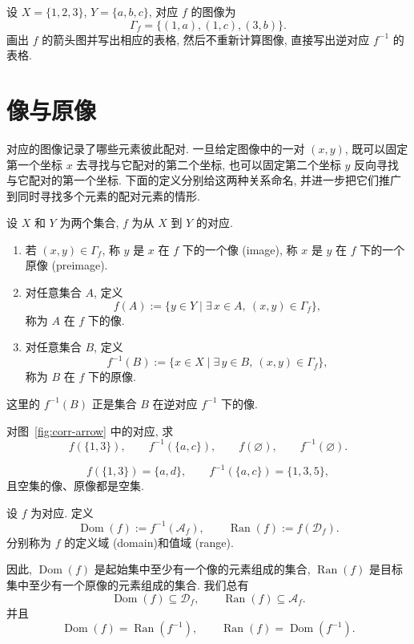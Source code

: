 \documentclass[usesamecnt, thmcnt=section, lang=cn, newtx, 10pt, scheme=chinese]{elegantbook}
\begin{document}
\begin{exercise}\label{ex:corr-representation}
设 $X=\{1,2,3\}$, $Y=\{a,b,c\}$, 对应 $f$ 的图像为
\[
 \Gamma_f=\{(1,a),(1,c),(3,b)\}.
\]
画出 $f$ 的箭头图并写出相应的表格, 然后不重新计算图像, 直接写出逆对应 $f^{-1}$ 的表格.
\end{exercise}

\section{像与原像}

对应的图像记录了哪些元素彼此配对. 一旦给定图像中的一对 $(x,y)$, 既可以固定第一个坐标 $x$ 去寻找与它配对的第二个坐标, 也可以固定第二个坐标 $y$ 反向寻找与它配对的第一个坐标. 下面的定义分别给这两种关系命名, 并进一步把它们推广到同时寻找多个元素的配对元素的情形.

\begin{definition}[像与原像]\label{def:corr-image-preimage}
设 $X$ 和 $Y$ 为两个集合, $f$ 为从 $X$ 到 $Y$ 的对应.
\begin{enumerate}[label=\rm(\arabic*)]
  \item 若 $(x,y)\in\Gamma_f$, 称 $y$ 是 $x$ 在 $f$ 下的一个{\color{blue}像 (image)}, 称 $x$ 是 $y$ 在 $f$ 下的一个{\color{blue}原像 (preimage)}.
  \item 对任意集合 $A$, 定义
  \[
   f(A):=\{y\in Y\mid \exists\,x\in A,\ (x,y)\in\Gamma_f\},
  \]
  称为 $A$ 在 $f$ 下的{\color{blue}像}.
  \item 对任意集合 $B$, 定义
  \[
   f^{-1}(B):=\{x\in X\mid \exists\,y\in B,\ (x,y)\in\Gamma_f\},
  \]
  称为 $B$ 在 $f$ 下的{\color{blue}原像}.
\end{enumerate}
这里的 $f^{-1}(B)$ 正是集合 $B$ 在逆对应 $f^{-1}$ 下的像.
\end{definition}

\begin{concept}\label{con:corr-04}
对图~\ref{fig:corr-arrow} 中的对应, 求
\[
 f(\{1,3\}),\qquad
 f^{-1}(\{a,c\}),\qquad
 f(\varnothing),\qquad
 f^{-1}(\varnothing).
\]
\end{concept}

\begin{solution}
\[
 f(\{1,3\})=\{a,d\},\qquad
 f^{-1}(\{a,c\})=\{1,3,5\},
\]
且空集的像、原像都是空集.
\end{solution}

\begin{definition}[定义域与值域]\label{def:corr-domain-image}
设 $f$ 为对应. 定义
\[
 \operatorname{Dom}(f):=f^{-1}(\mathscr A_f),
 \qquad
 \operatorname{Ran}(f):=f(\mathscr D_f).
\]
分别称为 $f$ 的{\color{blue}定义域 (domain)}和{\color{blue}值域 (range)}.

因此, $\operatorname{Dom}(f)$ 是起始集中至少有一个像的元素组成的集合, $\operatorname{Ran}(f)$ 是目标集中至少有一个原像的元素组成的集合. 我们总有
\[
 \operatorname{Dom}(f)\subseteq\mathscr D_f,
 \qquad
 \operatorname{Ran}(f)\subseteq\mathscr A_f.
\]
并且
\[
 \operatorname{Dom}(f)=\operatorname{Ran}(f^{-1}),
 \qquad
 \operatorname{Ran}(f)=\operatorname{Dom}(f^{-1}).
\]
\end{definition}
\end{document}
